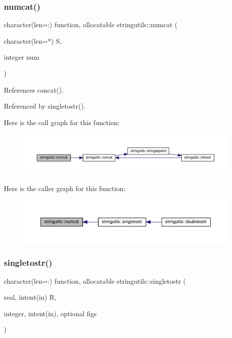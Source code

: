 \subsubsection{\texorpdfstring{numcat()}{numcat()}}
{\footnotesize\ttfamily character(len=\+:) function, allocatable stringutils\+::numcat (\begin{DoxyParamCaption}\item[{character(len=$\ast$)}]{S,  }\item[{integer}]{num }\end{DoxyParamCaption})}



References concat().



Referenced by singletostr().

Here is the call graph for this function\+:
\nopagebreak
\begin{figure}[H]
\begin{center}
\leavevmode
\includegraphics[width=350pt]{namespacestringutils_af68508e2bb36d836c0f94f476f728cb3_cgraph}
\end{center}
\end{figure}
Here is the caller graph for this function\+:
\nopagebreak
\begin{figure}[H]
\begin{center}
\leavevmode
\includegraphics[width=350pt]{namespacestringutils_af68508e2bb36d836c0f94f476f728cb3_icgraph}
\end{center}
\end{figure}
\mbox{\label{namespacestringutils_a9ee073baf898c055562e20577ad27013}} 
\subsubsection{\texorpdfstring{singletostr()}{singletostr()}}
{\footnotesize\ttfamily character(len=\+:) function, allocatable stringutils\+::singletostr (\begin{DoxyParamCaption}\item[{real, intent(in)}]{R,  }\item[{integer, intent(in), optional}]{figs }\end{DoxyParamCaption})}



